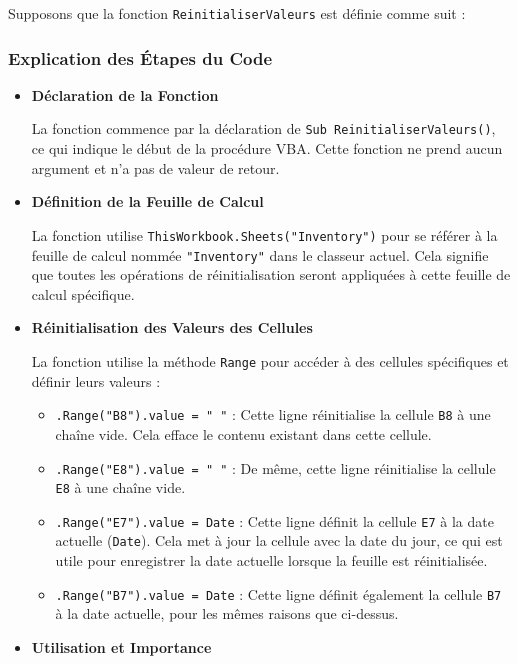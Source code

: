 \documentclass[a4paper, oneside, 12pt, final]{extreport}
\begin{document}
Supposons que la fonction \texttt{ReinitialiserValeurs} est définie comme suit :



\subsubsection{Explication des Étapes du Code}
\begin{itemize}


\item \textbf{Déclaration de la Fonction}

La fonction commence par la déclaration de \texttt{Sub ReinitialiserValeurs()}, ce qui indique le début de la procédure VBA. Cette fonction ne prend aucun argument et n'a pas de valeur de retour.

\item \textbf{Définition de la Feuille de Calcul}

La fonction utilise \texttt{ThisWorkbook.Sheets("Inventory")} pour se référer à la feuille de calcul nommée \texttt{"Inventory"} dans le classeur actuel. Cela signifie que toutes les opérations de réinitialisation seront appliquées à cette feuille de calcul spécifique.

\item \textbf{Réinitialisation des Valeurs des Cellules}

La fonction utilise la méthode \texttt{Range} pour accéder à des cellules spécifiques et définir leurs valeurs :

\begin{itemize}
    \item \texttt{.Range("B8").value = " "} : Cette ligne réinitialise la cellule \texttt{B8} à une chaîne vide. Cela efface le contenu existant dans cette cellule.
    \item \texttt{.Range("E8").value = " "} : De même, cette ligne réinitialise la cellule \texttt{E8} à une chaîne vide.
    \item \texttt{.Range("E7").value = Date} : Cette ligne définit la cellule \texttt{E7} à la date actuelle (\texttt{Date}). Cela met à jour la cellule avec la date du jour, ce qui est utile pour enregistrer la date actuelle lorsque la feuille est réinitialisée.
    \item \texttt{.Range("B7").value = Date} : Cette ligne définit également la cellule \texttt{B7} à la date actuelle, pour les mêmes raisons que ci-dessus.
\end{itemize}

\item \textbf{Utilisation et Importance}


\end{itemize}
\end{document}
